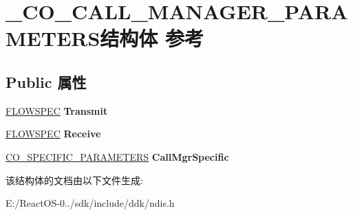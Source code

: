 \hypertarget{struct___c_o___c_a_l_l___m_a_n_a_g_e_r___p_a_r_a_m_e_t_e_r_s}{}\section{\+\_\+\+C\+O\+\_\+\+C\+A\+L\+L\+\_\+\+M\+A\+N\+A\+G\+E\+R\+\_\+\+P\+A\+R\+A\+M\+E\+T\+E\+R\+S结构体 参考}
\label{struct___c_o___c_a_l_l___m_a_n_a_g_e_r___p_a_r_a_m_e_t_e_r_s}
\subsection*{Public 属性}
\begin{DoxyCompactItemize}
\item 
\mbox{\label{struct___c_o___c_a_l_l___m_a_n_a_g_e_r___p_a_r_a_m_e_t_e_r_s_af5efb9b66d3bf584832b7c570d0b0690}} 
\hyperlink{struct__flowspec}{F\+L\+O\+W\+S\+P\+EC} {\bfseries Transmit}
\item 
\mbox{\label{struct___c_o___c_a_l_l___m_a_n_a_g_e_r___p_a_r_a_m_e_t_e_r_s_a451fe33488c02d1cd0b1f5bd7badf637}} 
\hyperlink{struct__flowspec}{F\+L\+O\+W\+S\+P\+EC} {\bfseries Receive}
\item 
\mbox{\label{struct___c_o___c_a_l_l___m_a_n_a_g_e_r___p_a_r_a_m_e_t_e_r_s_a86fa3355e75a1e0e30033d4dd81ffadc}} 
\hyperlink{struct___c_o___s_p_e_c_i_f_i_c___p_a_r_a_m_e_t_e_r_s}{C\+O\+\_\+\+S\+P\+E\+C\+I\+F\+I\+C\+\_\+\+P\+A\+R\+A\+M\+E\+T\+E\+RS} {\bfseries Call\+Mgr\+Specific}
\end{DoxyCompactItemize}


该结构体的文档由以下文件生成\+:\begin{DoxyCompactItemize}
\item 
E\+:/\+React\+O\+S-\/0../sdk/include/ddk/ndis.\+h\end{DoxyCompactItemize}
